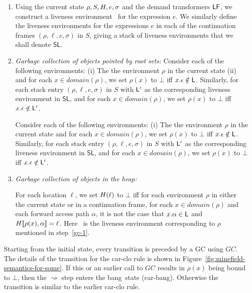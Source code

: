 \documentclass[9pt]{sigplanconf}
\newcommand{\stk}{{S}}
\newcommand{\bang}{\mbox{\sc bang}}
\begin{document}
\begin{enumerate}
\begin{enumerate}
  \item  \label{gc-1}Using the  current state  $\rho, \stk,  \heap, e,
    \sigma$  and the  demand  transformers $\mathsf{LF}$,  we construct  a
    liveness environment  \Lv\ for  the expression $e$.   We similarly
    define the liveness environments for the expressions $e$ in each of
    the  continuation frames $(\rho,  \ell, e,  \sigma)$ in
    $S$, giving a stack of  liveness environments that we shall denote
    $\mathsf{SL}$.
  \item \emph{Garbage collection of objects pointed by root sets:}
    Consider each of the following environments: (i) The 
    the environment $\rho$ in the current state (ii) and for each $x \in
    domain(\rho)$, we  set $\rho(x)$ to $\bot$  iff $x.\epsilon \notin
    \mathsf{L}$.  Similarly,  for each  stack entry $(\rho,\ell,e,\sigma)$
    in $S$ 
    with  $\mathsf{L}'$   as  the   corresponding  liveness   environment  in
    $\mathsf{SL}$, and for each $x \in domain(\rho)$, we set $\rho(x)$
    to $\bot$ iff $x.\epsilon \notin \mathsf{L}'$.

Consider each of the following environments: (i) The 
    the environment $\rho$ in the current state and for each $x \in
    domain(\rho)$, we  set $\rho(x)$ to $\bot$  iff $x.\epsilon \notin
    \mathsf{L}$.  Similarly,  for each  stack entry $(\rho,\ell,e,\sigma)$
    in $S$ 
    with  $\mathsf{L}'$   as  the   corresponding  liveness   environment  in
    $\mathsf{SL}$, and for each $x \in domain(\rho)$, we set $\rho(x)$
    to $\bot$ iff $x.\epsilon \notin \mathsf{L}'$.


  \item \emph{Garbage  collection of  objects in  the heap:}  


    For each
    location $\ell$,  we set $H(\ell)$  to $\bot$ iff for each
    environment $\rho$ in either  the  current state or in a
    continuation frame, for each $x \in domain(\rho)$ and each forward
    access
    path $\alpha$, it is not the case that $x.\alpha \in \mathsf{L}$ and $H\llbracket\rho(x), \alpha
    \rrbracket = \ell$. Here 
\Lv\ is the liveness environment  corresponding to $\rho$ mentioned in
step~\ref{gc-1}.
  \end{enumerate}
\end{enumerate}
Starting from the initial state,
every transition  is preceded  by a  GC
using $GC$.  The details of the transition for the {\sc
  car-clo}  rule   is  shown   in
Figure~\ref{fig:minefield-semantics-for-some}.  If  this  or  an
earlier  call to  $GC$  results  in $\rho(x)$  being
bound  to  $\bot$,  then  the  $\rightsquigarrow$  step
enters the  \bang\ state ({\sc  car-bang}). Otherwise
the transition is similar to the earlier {\sc car-clo}
rule. 
\end{document}
